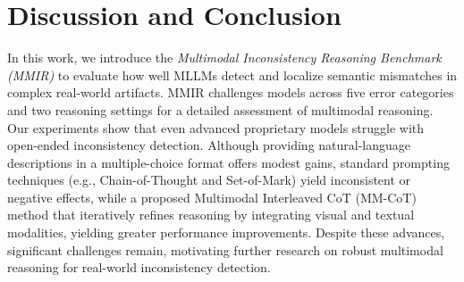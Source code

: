 \section{Discussion and Conclusion}

In this work, we introduce the \textit{Multimodal Inconsistency Reasoning Benchmark (MMIR)} to evaluate how well MLLMs detect and localize semantic mismatches in complex real-world artifacts. MMIR challenges models across five error categories and two reasoning settings for a detailed assessment of multimodal reasoning.
Our experiments show that even advanced proprietary models struggle with open-ended inconsistency detection. Although providing natural-language descriptions in a multiple-choice format offers modest gains, standard prompting techniques (e.g., Chain-of-Thought and Set-of-Mark) yield inconsistent or negative effects, while a proposed Multimodal Interleaved CoT (MM-CoT) method that iteratively refines reasoning by integrating visual and textual modalities, yielding greater performance improvements. Despite these advances, significant challenges remain, motivating further research on robust multimodal reasoning for real-world inconsistency detection.

